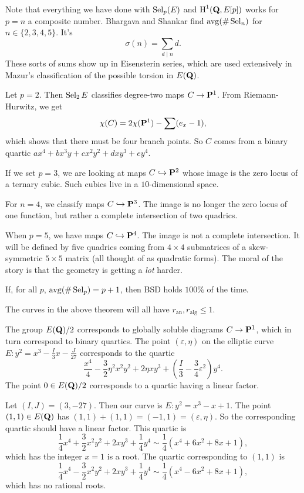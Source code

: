 Note that everything we have done with $\operatorname{Sel}_p(E)$ and $\operatorname{H}^1(\mathbf{Q},E[p])$ 
works for $p=n$ a composite number. Bhargava and Shankar find 
$\operatorname{avg}(\#\operatorname{Sel}_n)$ for $n\in \{2,3,4,5\}$. It's 
\[
  \sigma(n) = \sum_{d\mid n} d .
\]
These sorts of sums show up in Eisensterin series, which are used extensively 
in Mazur's classification of the possible torsion in $E(\mathbf{Q})$. 

Let $p=2$. Then $\operatorname{Sel}_2 E$ classifies degree-two maps $C\to \mathbf{P}^1$. 
From Riemann-Hurwitz, we get 
\[
  \chi(C) = 2\chi(\mathbf{P}^1) - \sum (e_x -1) ,
\]
which shows that there must be four branch points. So $C$ comes from a 
binary quartic $a x^4+b x^3 y+c x^2 y^2+d x y^3+e y^4$. 

If we set $p=3$, we are looking at maps $C\hookrightarrow \mathbf{P}^2$ whose image is the 
zero locus of a ternary cubic. Such cubics live in a $10$-dimensional space. 

For $n=4$, we classify maps $C\hookrightarrow \mathbf{P}^3$. The image is no longer the zero 
locus of one function, but rather a complete intersection of two quadrics. 

When $p=5$, we have maps $C\hookrightarrow \mathbf{P}^4$. The image is not a complete 
intersection. It will be defined by five quadrics coming from 
$4\times 4$ submatrices of a skew-symmetric $5\times 5$ matrix (all thought of 
as quadratic forms). The moral of the story is that the geometry is getting a 
\emph{lot} harder. 

\begin{theorem}
If, for all $p$, $\operatorname{avg}(\#\operatorname{Sel}_p)=p+1$, then BSD holds $100\%$ of the 
time. 
\end{theorem}

The curves in the above theorem will all have 
$r_\mathrm{an},r_\mathrm{alg}\leqslant 1$. 

The group $E(\mathbf{Q})/2$ corresponds to globally soluble diagrams $C\to \mathbf{P}^1$, 
which in turn correspond to binary quartics. The point $(\varepsilon,\eta)$ on 
the elliptic curve $E:y^2=x^3-\frac I 3 x - \frac{J}{27}$ corresponds to the 
quartic 
\[
  \frac{x^4}{4}-\frac 3 2 \eta^2 x^2 y^2 + 2\eta x y^3 + \left(\frac I 3-\frac 3 4\varepsilon^2\right) y^4 .
\]
The point $0\in E(\mathbf{Q})/2$ corresponds to a quartic having a linear factor. 

\begin{example}
Let $(I,J)=(3,-27)$. Then our curve is $E:y^2=x^3-x+1$. The point 
$(1,1)\in E(\mathbf{Q})$ has $(1,1)+(1,1)=(-1,1)=(\varepsilon,\eta)$. So the 
corresponding quartic should have a linear factor. This quartic is 
\[
  \frac 1 4 x^4 + \frac 3 2 x^2 y^2 + 2 x y^3 + \frac 1 4 y^4 
    \sim \frac 1 4 (x^4 + 6 x^2 + 8 x+1) ,
\]
which has the integer $x=1$ is a root. The quartic corresponding to $(1,1)$ 
is 
\[
  \frac 1 4 x^4 - \frac 3 2 x^2 y^2 + 2 x y^3 + \frac 1 4 y^4 
    \sim \frac 1 4(x^4-6 x^2+8 x+1) ,
\]
which has no rational roots. 
\end{example}

